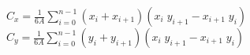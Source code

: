$C_x = \frac{1} {6A}\sum_{i = 0}^ {n - 1}(x_i + x_{i + 1})(x_i\; y_{i + 1} -x_{i + 1}\;
    y_i)$ \newline
$C_y = \frac{1} {6A}\sum_{i = 0}^ {n - 1}(y_i + y_{i + 1})(x_i\; y_{i + 1} -x_{i + 1}\;
    y_i)$
